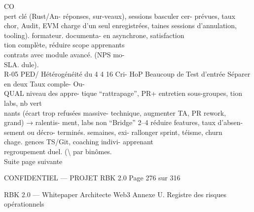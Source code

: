 \documentclass[12pt,landscape,a4paper]{article}
\newenvironment{confidential}
{\begin{tcolorbox}[
    colback=rbkred!5!white,
    colframe=rbkred!75!black,
    title=CONFIDENTIEL,
    fonttitle=\bfseries\color{white},
    coltitle=rbkred!75!black,
    breakable,
    enhanced,
    frame hidden,
    borderline west={2pt}{0pt}{rbkred!75!black}
]}
{\end{tcolorbox}}
\begin{document}
CO\\
pert clé (Rust/An-                     réponses,     sur-veaux), sessions basculer    cer- prévues, taux\\
chor, Audit, EVM                       charge d’un seul enregistrées,     taines sessions d’annulation,\\
tooling).                              formateur.        documenta-       en asynchrone, satisfaction\\
tion   complète, réduire   scope apprenants\\
contrats    avec module avancé. (NPS        mo-\\
SLA.                              dule).\\
R-05   PED/     Hétérogénéité du 4 4 16 Cri- HoP       Beaucoup      de Test      d’entrée Séparer en deux Taux comple- Ou-\\
QUAL     niveau des appre-       tique          “rattrapage”, PR+         entretien sous-groupes,      tion labs, nb vert\\
nants (écart trop                      refusées massive- technique,         augmenter TA, PR        rework,\\
grand) → ralentis-                     ment, labs non “Bridge”        2–4 réduire features, taux d’absen-\\
sement ou décro-                       terminés.         semaines,     exi- rallonger sprint, téisme, churn\\
chage.                                                   gences TS/Git, coaching indivi- apprenant\\
regroupement duel.                  (\textbackslash{}%
par binômes.\\
Suite page suivante\\
\vspace{0.5em}
\vspace{0.5em}
\vspace{0.5em}
\vspace{0.5em}
\begin{confidential}CONFIDENTIEL — PROJET RBK 2.0                                                                                       Page 276 sur 316\end{confidential}
RBK 2.0 — Whitepaper Architecte Web3                                                                                                                 Annexe U. Registre des risques opérationnels\\
\vspace{0.5em}
\end{document}
